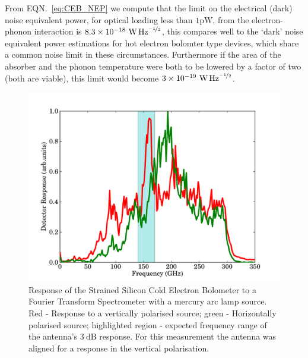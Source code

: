 \documentclass[aip, apl, a4paper, amsmath,amssymb, reprint]{revtex4-1}
\begin{document}
From EQN.~\ref{eq:CEB_NEP} we compute that the limit on the electrical (dark) noise equivalent power, for optical loading less than $1\mathrm{pW}$, from the electron-phonon interaction is $8.3 \times 10^{-18}~\mathrm{\mbox{W\,Hz}^{\nicefrac{-1}{2}}}$, this compares well to the `dark' noise equivalent power estimations for hot electron bolomter type devices\cite{Karasik2011}, which share a common noise limit in these circumstances. Furthermore if the area of the absorber and the phonon temperature were both to be lowered by a factor of two (both are viable), this limit would become $3 \times 10^{-19}~\mathrm{\mbox{W\,Hz}^{\nicefrac{-1}{2}}}$.
\begin{figure}[ht]
\includegraphics[width = 0.8\columnwidth]{01_FTS_response}
\caption{Response of the Strained Silicon Cold Electron Bolometer to a Fourier Transform Spectrometer with a mercury arc lamp source. Red - Response to a vertically polarised source; green - Horizontally polarised source; highlighted region - expected frequency range of the antenna's $3~\mathrm{dB}$ response. For this measurement the antenna was aligned for a response in the vertical polarisation.}
\label{fig:FTS_response}
\end{figure}
\end{document}
